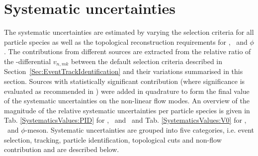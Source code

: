 \section{Systematic uncertainties}
\label{Sec:Systematics}

The systematic uncertainties are estimated by varying the selection criteria for all particle species as well as the topological reconstruction requirements for \Ks, \lambdas~and $\phi$. The contributions from different sources are extracted from the relative ratio of the \pT-differential $v_{n,mk}$ between the default selection criteria described in Section~\ref{Sec:EventTrackIdentification} and their variations summarised in this section. Sources with statistically significant contribution (where significance is evaluated as recommended in \cite{Barlow:2002yb}) were added in quadrature to form the final value of the systematic uncertainties on the non-linear flow modes. 
An overview of the magnitude of the relative systematic uncertainties per particle species is given in Tab. \ref{SystematicsValues:PID} for \pion, \kaon~and \proton~and Tab. \ref{SystematicsValues:V0} for \Ks, \lambdas~and $\phi$-meson. Systematic uncertainties are grouped into five categories, i.e. event selection, tracking, particle identification, topological cuts and non-flow contribution and are described below.


